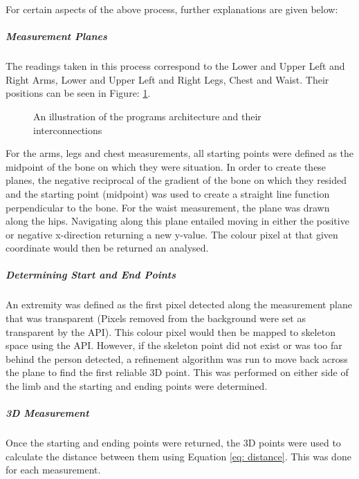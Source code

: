For certain aspects of the above process, further explanations are given below:

\subparagraph{Measurement Planes}
The readings taken in this process correspond to the Lower and Upper Left and Right Arms, Lower and Upper Left and Right Legs, Chest and Waist. Their positions can be seen in Figure: \ref{fig:measurementPlanes}.

\begin{figure}[ht]
	\centering
	{%
		\setlength{\fboxsep}{0pt}%
		\setlength{\fboxrule}{0.5pt}%
		}
	\caption{An illustration of the programs architecture and their interconnections}
	\label{fig:measurementPlanes}
\end{figure}

For the arms, legs and chest measurements, all starting points were defined as the midpoint of the bone on which they were situation. In order to create these planes, the negative reciprocal of the gradient of the bone on which they resided and the starting point (midpoint) was used to create a straight line function perpendicular to the bone. For the waist measurement, the plane was drawn along the hips. Navigating along this plane entailed moving in either the positive or negative x-direction returning a new y-value. The colour pixel at that given coordinate would then be returned an analysed. 

\subparagraph{Determining Start and End Points}
An extremity was defined as the first pixel detected along the measurement plane that was transparent (Pixels removed from the background were set as transparent by the API). This colour pixel would then be mapped to skeleton space using the API. However, if the skeleton point did not exist or was too far behind the person detected, a refinement algorithm was run to move back across the plane to find the first reliable 3D point. This was performed on either side of the limb and the starting and ending points were determined.

\subparagraph{3D Measurement}
Once the starting and ending points were returned, the 3D points were used to calculate the distance between them using Equation \ref{eq: distance}. This was done for each measurement.

